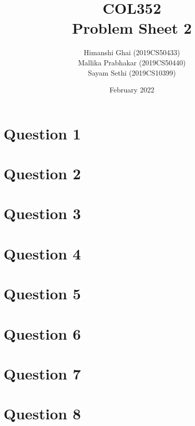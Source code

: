 \documentclass[11pt]{article}
\title{COL352\\Problem Sheet 2}
\author{Himanshi Ghai (2019CS50433)\\Mallika Prabhakar (2019CS50440)\\Sayam Sethi (2019CS10399)}
\date{February 2022}
\begin{document}
\maketitle

\tableofcontents


\newpage
\section{Question 1}



\newpage
\section{Question 2}



\newpage
\section{Question 3}



\newpage
\section{Question 4}



\newpage
\section{Question 5}



\newpage
\section{Question 6}



\newpage
\section{Question 7}



\newpage
\section{Question 8}


\end{document}
